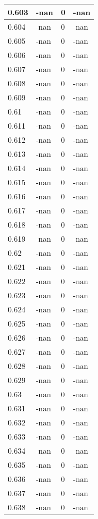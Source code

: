 \documentclass[a4paper,14pt]{extarticle}
\begin{document}
\begin{longtable}{||m{3cm}||m{3cm}|m{3cm}||m{3cm}||}
\hline
0.603 & -nan & 0 & -nan\\
\hline
0.604 & -nan & 0 & -nan\\
\hline
0.605 & -nan & 0 & -nan\\
\hline
0.606 & -nan & 0 & -nan\\
\hline
0.607 & -nan & 0 & -nan\\
\hline
0.608 & -nan & 0 & -nan\\
\hline
0.609 & -nan & 0 & -nan\\
\hline
0.61 & -nan & 0 & -nan\\
\hline
0.611 & -nan & 0 & -nan\\
\hline
0.612 & -nan & 0 & -nan\\
\hline
0.613 & -nan & 0 & -nan\\
\hline
0.614 & -nan & 0 & -nan\\
\hline
0.615 & -nan & 0 & -nan\\
\hline
0.616 & -nan & 0 & -nan\\
\hline
0.617 & -nan & 0 & -nan\\
\hline
0.618 & -nan & 0 & -nan\\
\hline
0.619 & -nan & 0 & -nan\\
\hline
0.62 & -nan & 0 & -nan\\
\hline
0.621 & -nan & 0 & -nan\\
\hline
0.622 & -nan & 0 & -nan\\
\hline
0.623 & -nan & 0 & -nan\\
\hline
0.624 & -nan & 0 & -nan\\
\hline
0.625 & -nan & 0 & -nan\\
\hline
0.626 & -nan & 0 & -nan\\
\hline
0.627 & -nan & 0 & -nan\\
\hline
0.628 & -nan & 0 & -nan\\
\hline
0.629 & -nan & 0 & -nan\\
\hline
0.63 & -nan & 0 & -nan\\
\hline
0.631 & -nan & 0 & -nan\\
\hline
0.632 & -nan & 0 & -nan\\
\hline
0.633 & -nan & 0 & -nan\\
\hline
0.634 & -nan & 0 & -nan\\
\hline
0.635 & -nan & 0 & -nan\\
\hline
0.636 & -nan & 0 & -nan\\
\hline
0.637 & -nan & 0 & -nan\\
\hline
0.638 & -nan & 0 & -nan\\

\end{longtable}
\end{document}
